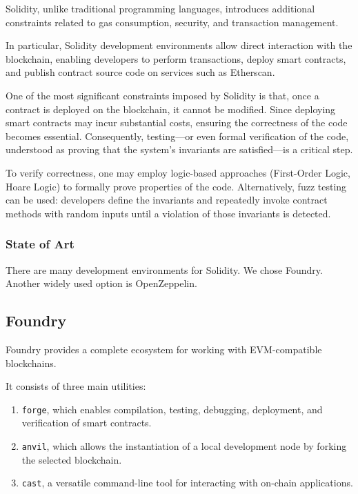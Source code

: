 \documentclass[conference]{IEEEtran}
\begin{document}
Solidity, unlike traditional programming languages, introduces additional constraints related to gas consumption, security, and transaction management.

In particular, Solidity development environments allow direct interaction with the blockchain, enabling developers to perform transactions, deploy smart contracts, and publish contract source code on services such as Etherscan.

One of the most significant constraints imposed by Solidity is that, once a contract is deployed on the blockchain, it cannot be modified. Since deploying smart contracts may incur substantial costs, ensuring the correctness of the code becomes essential. Consequently, testing—or even formal verification of the code, understood as proving that the system’s invariants are satisfied—is a critical step.

To verify correctness, one may employ logic-based approaches (First-Order Logic, Hoare Logic) to formally prove properties of the code. Alternatively, fuzz testing can be used: developers define the invariants and repeatedly invoke contract methods with random inputs until a violation of those invariants is detected.

\subsubsection{State of Art}

There are many development environments for Solidity. We chose Foundry. Another widely used option is OpenZeppelin.


\subsection{Foundry}

Foundry provides a complete ecosystem for working with EVM-compatible blockchains.

It consists of three main utilities:

\begin{enumerate}
\item \texttt{forge}, which enables compilation, testing, debugging, deployment, and verification of smart contracts.
\item \texttt{anvil}, which allows the instantiation of a local development node by forking the selected blockchain.
\item \texttt{cast}, a versatile command-line tool for interacting with on-chain applications.
\end{enumerate}
\end{document}
